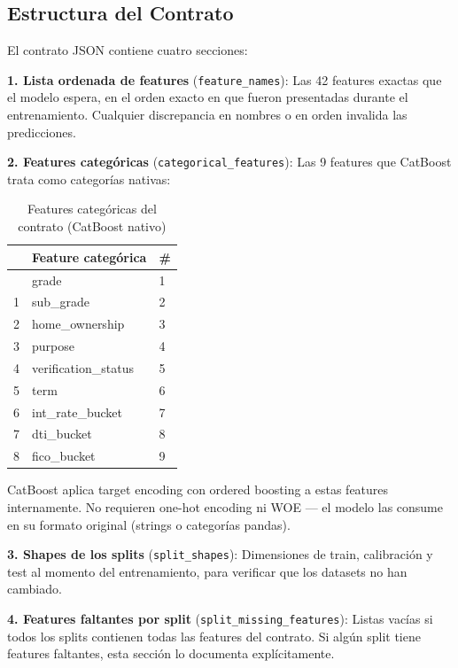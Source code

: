 \documentclass[
  spanish,
  11pt,
  letterpaper,
]{scrbook}
\theoremstyle{plain}
\theoremstyle{remark}
\begin{document}
\subsection{Estructura del Contrato}\label{estructura-del-contrato}

El contrato JSON contiene cuatro secciones:

\textbf{1. Lista ordenada de features} (\texttt{feature\_names}): Las 42
features exactas que el modelo espera, en el orden exacto en que fueron
presentadas durante el entrenamiento. Cualquier discrepancia en nombres
o en orden invalida las predicciones.

\textbf{2. Features categóricas} (\texttt{categorical\_features}): Las 9
features que CatBoost trata como categorías nativas:

{

\begin{longtable}[]{@{}lll@{}}

\caption{\label{tbl-categorical-features}Features categóricas del
contrato (CatBoost nativo)}

\tabularnewline

\toprule\noalign{}
& Feature categórica & \# \\
\midrule\noalign{}
\endhead
\bottomrule\noalign{}
\endlastfoot
0 & grade & 1 \\
1 & sub\_grade & 2 \\
2 & home\_ownership & 3 \\
3 & purpose & 4 \\
4 & verification\_status & 5 \\
5 & term & 6 \\
6 & int\_rate\_bucket & 7 \\
7 & dti\_bucket & 8 \\
8 & fico\_bucket & 9 \\

\end{longtable}

}

CatBoost aplica target encoding con ordered boosting a estas features
internamente. No requieren one-hot encoding ni WOE --- el modelo las
consume en su formato original (strings o categorías pandas).

\textbf{3. Shapes de los splits} (\texttt{split\_shapes}): Dimensiones
de train, calibración y test al momento del entrenamiento, para
verificar que los datasets no han cambiado.

\textbf{4. Features faltantes por split}
(\texttt{split\_missing\_features}): Listas vacías si todos los splits
contienen todas las features del contrato. Si algún split tiene features
faltantes, esta sección lo documenta explícitamente.
\end{document}
